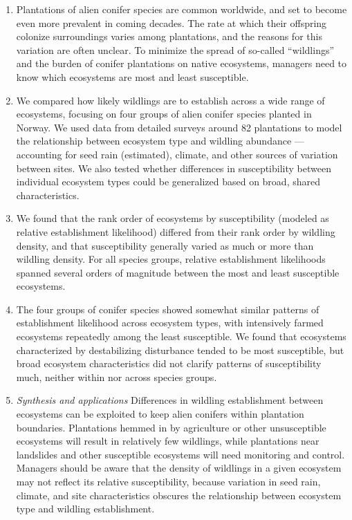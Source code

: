 \documentclass[
]{article}
\providecommand{\tightlist}{%
  \setlength{\itemsep}{0pt}\setlength{\parskip}{0pt}}
\begin{document}
\begin{enumerate}
\def\labelenumi{\arabic{enumi}.}
\tightlist
\item
  Plantations of alien conifer species are common worldwide, and set to become even more prevalent in coming decades. The rate at which their offspring colonize surroundings varies among plantations, and the reasons for this variation are often unclear. To minimize the spread of so-called ``wildlings'' and the burden of conifer plantations on native ecosystems, managers need to know which ecosystems are most and least susceptible.
\item
  We compared how likely wildlings are to establish across a wide range of ecosystems, focusing on four groups of alien conifer species planted in Norway. We used data from detailed surveys around 82 plantations to model the relationship between ecosystem type and wildling abundance --- accounting for seed rain (estimated), climate, and other sources of variation between sites. We also tested whether differences in susceptibility between individual ecosystem types could be generalized based on broad, shared characteristics.
\item
  We found that the rank order of ecosystems by susceptibility (modeled as relative establishment likelihood) differed from their rank order by wildling density, and that susceptibility generally varied as much or more than wildling density. For all species groups, relative establishment likelihoods spanned several orders of magnitude between the most and least susceptible ecosystems.
\item
  The four groups of conifer species showed somewhat similar patterns of establishment likelihood across ecosystem types, with intensively farmed ecosystems repeatedly among the least susceptible. We found that ecosystems characterized by destabilizing disturbance tended to be most susceptible, but broad ecosystem characteristics did not clarify patterns of susceptibility much, neither within nor across species groups.
\item
  \emph{Synthesis and applications} Differences in wildling establishment between ecosystems can be exploited to keep alien conifers within plantation boundaries. Plantations hemmed in by agriculture or other unsusceptible ecosystems will result in relatively few wildlings, while plantations near landslides and other susceptible ecosystems will need monitoring and control. Managers should be aware that the density of wildlings in a given ecosystem may not reflect its relative susceptibility, because variation in seed rain, climate, and site characteristics obscures the relationship between ecosystem type and wildling establishment.
\end{enumerate}
\end{document}
